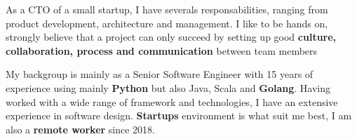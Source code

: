 

\begin{cvparagraph}

As a CTO of a small startup, I have severals responsabilities, ranging from product development, architecture and management.\newline
I like to be hands on, strongly believe that a project can only succeed by setting up good \textbf{culture, collaboration, process and communication} between team members

My backgroup is mainly as a Senior Software Engineer with 15 years of experience using mainly \textbf{Python} but also Java, Scala and \textbf{Golang}.\newline
Having worked with a wide range of framework and technologies, I have an extensive experience in software design.\newline
\textbf{Startups} environment is what suit me best, I am also a \textbf{remote worker} since 2018.

\end{cvparagraph}
